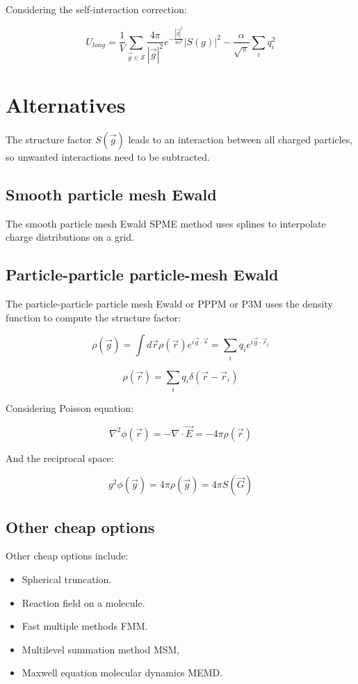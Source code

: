 	Considering the self-interaction correction:

	$$U_{long} = \frac{1}{V}\sum\limits_{\vec{g}\in\mathcal{S}}\frac{4\pi}{|\vec{g}|^2}e^{-\frac{|\vec{g}|^2}{4\alpha^2}}|S(g)|^2-\frac{\alpha}{\sqrt{\pi}}\sum\limits_iq_i^2$$

\section{Alternatives}
The structure factor $S(\vec{g})$ leads to an interaction between all charged particles, so unwanted interactions need to be subtracted.

	\subsection{Smooth particle mesh Ewald}
	The smooth particle mesh Ewald SPME method uses splines to interpolate charge distributions on a grid.

	\subsection{Particle-particle particle-mesh Ewald}
	The particle-particle particle mesh Ewald or PPPM or P3M uses the density function to compute the structure factor:

	$$\rho(\vec{g}) = \int d\vec{r}\rho(\vec{r})e^{i\vec{g}\cdot\vec{r}} = \sum\limits_i q_i e^{i\vec{g}\cdot\vec{r}_i}$$

	$$\rho(\vec{r}) = \sum\limits_{i}q_i\delta(\vec{r}-\vec{r}_i)$$

	Considering Poisson equation:

	$$\nabla^2\phi(\vec{r}) = -\nabla\cdot\vec{E} = -4\pi\rho(\vec{r})$$

	And the reciprocal space:

	$$g^2\phi(\vec{g}) = 4\pi\rho(\vec{g}) = 4\pi S(\vec{G})$$

	\subsection{Other cheap options}
	Other cheap options include:

	\begin{multicols}{2}
		\begin{itemize}
			\item Spherical truncation.
			\item Reaction field on a molecule.
			\item Fast multiple methods FMM.
			\item Multilevel summation method MSM,
			\item Maxwell equation molecular dynamics MEMD.
		\end{itemize}
	\end{multicols}

